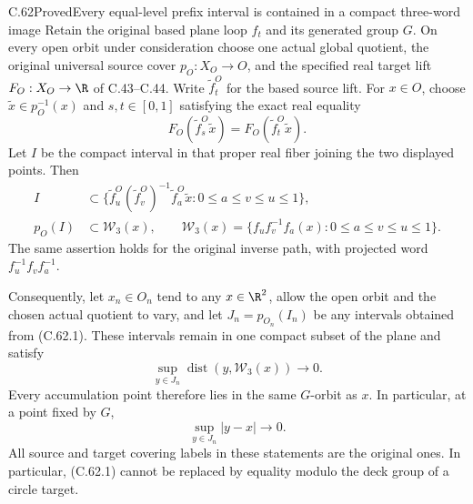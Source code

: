 \begin{claim}{C.62}{Proved}{Every equal-level prefix interval is contained in a compact three-word image}
Retain the original based plane loop $f_t$ and its generated
group $G$. On every open orbit under consideration choose one
actual global quotient, the original universal source cover
$p_O:X_O\to O$, and the specified real target lift
$F_O:X_O\to\R$ of C.43--C.44. Write
$\widetilde f_t^O$ for the based source lift.
For $x\in O$, choose $\widetilde x\in p_O^{-1}(x)$ and
$s,t\in[0,1]$ satisfying the exact real equality
\[
 F_O(\widetilde f_s^O\widetilde x)
   =F_O(\widetilde f_t^O\widetilde x).
                                                               \tag{C.62.1}
\]
Let $I$ be the compact interval in that proper real fiber
joining the two displayed points. Then
\[
 \begin{split}
 I&\subset
 \{\widetilde f_u^O(\widetilde f_v^O)^{-1}
                   \widetilde f_a^O\widetilde x:
                          0\leq a\leq v\leq u\leq1\},\\
 p_O(I)&\subset\mathcal W_3(x),\qquad
 \mathcal W_3(x)=
 \{f_u f_v^{-1}f_a(x):0\leq a\leq v\leq u\leq1\}.
 \end{split}                                                   \tag{C.62.2}
\]
The same assertion holds for the original inverse path,
with projected word $f_u^{-1}f_vf_a^{-1}$.

Consequently, let $x_n\in O_n$ tend to any $x\in\R^2$,
allow the open orbit and the chosen actual quotient to vary,
and let $J_n=p_{O_n}(I_n)$ be any intervals obtained from
(C.62.1). These intervals remain in one compact subset of
the plane and satisfy
\[
 \sup_{y\in J_n}\operatorname{dist}
                (y,\mathcal W_3(x))\longrightarrow0.
                                                               \tag{C.62.3}
\]
Every accumulation point therefore lies in the same
$G$-orbit as $x$. In particular, at a point fixed by $G$,
\[
                    \sup_{y\in J_n}|y-x|\longrightarrow0.
                                                               \tag{C.62.4}
\]
All source and target covering labels in these statements
are the original ones. In particular, (C.62.1) cannot be
replaced by equality modulo the deck group of a circle
target.
\end{claim}

